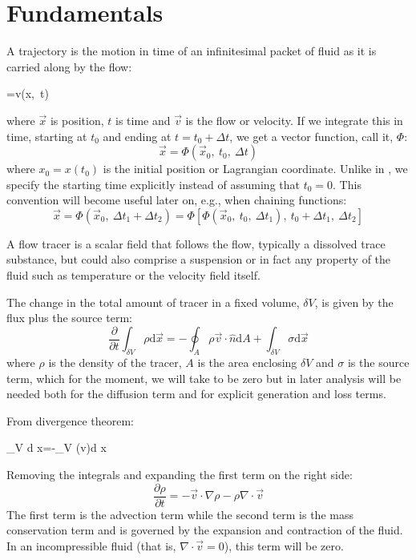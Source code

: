 \section{Fundamentals}

A trajectory is the motion in time of an infinitesimal packet of fluid
as it is carried along by the flow:
\begin{eqnl}
	=\vec v(\vec x,~t) \label{trajectory_equation}
\end{eqnl}
where $\vec x$ is position, $t$ is time and $\vec v$ is the flow or velocity.
If we integrate this in time, starting at $t_0$ and ending at $t=t_0+\Delta t$, we get a
vector function, call it, $\Phi$:
\begin{equation}
	\vec x=\Phi(\vec x_0,~t_0,~\Delta t)
\label{traj_def}
\end{equation}
where $x_0=x(t_0)$ is the initial position or Lagrangian coordinate.
Unlike in \citet{Ottino1989}, we specify the starting time explicitly instead 
of assuming that $t_0=0$.  This convention will become useful later on, e.g., 
when chaining functions:
\begin{equation}
\vec x=\Phi(\vec x_0,~\Delta t_1+\Delta t_2)=\Phi[\Phi(\vec x_0,~t_0,~\Delta t_1),~t_0 + \Delta t_1,~\Delta t_2]
\label{traj_fun_chaining}
\end{equation}

A flow tracer is a scalar field that follows the flow, typically a dissolved
trace substance, but could also comprise a suspension or in fact any property
of the fluid such as temperature or the velocity field itself.

The change in the total amount of tracer in a fixed volume, $\delta V$, is given
by the flux plus the source term:
\begin{equation}
	\frac{\partial}{\partial t}\int_{\delta V} \rho \mathrm d \vec x=-\oint_A \rho \vec v \cdot \hat n \mathrm d A
	+ \int_{\delta V} \sigma \mathrm d \vec x
	\label{volume_conservation_integral}
\end{equation}
where $\rho$ is the density of the tracer,
$A$ is the area enclosing $\delta V$ and $\sigma$ is the source term, which for the moment,
we will take to be zero but in later analysis will 
be needed both for the diffusion term and for explicit generation and loss terms.

From divergence theorem:
\begin{eqnl}
	\int_{\delta V}  \mathrm d \vec x=-\int_{\delta V} \nabla \cdot (\rho \vec v)\mathrm d \vec x 
\end{eqnl}
Removing the integrals and expanding the first term on the right side:
\begin{equation}
\frac{\partial \rho}{\partial t} =-\vec v \cdot \nabla \rho - \rho \nabla \cdot \vec v 
\label{mass_conservation_Eulerian}
\end{equation}
The first term is the advection term while the second term is the mass
conservation term and is governed by the 
expansion and contraction of the fluid.  In an incompressible fluid (that is,
$\nabla \cdot \vec v = 0$), this term will be zero.

